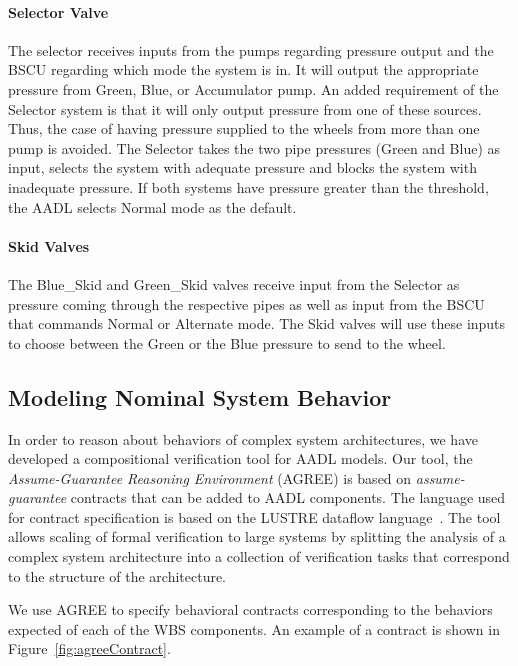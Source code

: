 \paragraph{Selector Valve}
The selector receives inputs from the pumps regarding pressure output and the BSCU regarding which mode the system is in. It will output the appropriate pressure from Green, Blue, or Accumulator pump. An added requirement of the Selector system is that it will only output pressure from one of these sources. Thus, the case of having pressure supplied to the wheels from more than one pump is avoided. The Selector takes the two pipe pressures (Green and Blue) as input, selects the system with adequate pressure and blocks the system with inadequate pressure. If both systems have pressure greater than the threshold, the AADL selects Normal mode as the default.

\paragraph{Skid Valves}
The Blue\_Skid and Green\_Skid valves receive input from the Selector as pressure coming through the respective pipes as well as input from the BSCU that commands Normal or Alternate mode. The Skid valves will use these inputs to choose between the Green or the Blue pressure to send to the wheel.

\subsection{Modeling Nominal System Behavior}
In order to reason about behaviors of complex system architectures, we have developed a compositional verification tool for AADL models.  
Our tool, the {\em Assume-Guarantee Reasoning Environment} (AGREE) \cite{NFM2012:CoGaMiWhLaLu}  is based on {\em assume-guarantee} contracts that can be added to AADL components.  The language used for contract specification is based on the LUSTRE dataflow language~\cite{Halbwachs91:IEEE}. The tool allows scaling of formal verification to large systems by splitting the analysis of a complex system architecture into a collection of verification tasks that correspond to the structure of the architecture.

We use AGREE to specify behavioral contracts corresponding to the behaviors expected of each of the WBS components. An example of a contract is shown in Figure~\ref{fig:agreeContract}.
%

